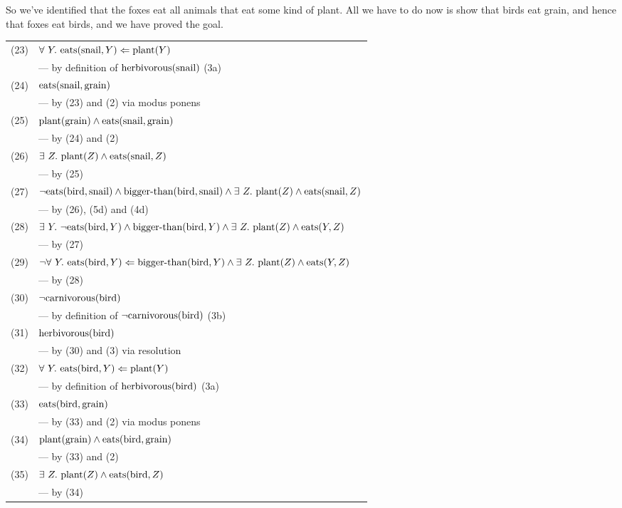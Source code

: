 So we've identified that the foxes eat all animals that eat some kind of
plant.  All we have to do now is show that birds eat grain, and hence
that foxes eat birds, and we have proved the goal.

\begin{tabular}{rl}
(23) & $\forall\ Y.\ \text{eats}(\text{snail}, Y) \Leftarrow \text{plant}(Y)$
\\ & --- by definition of $\text{herbivorous}(\text{snail})$ (3a) \\
(24) & $\text{eats}(\text{snail}, \text{grain})$
\\ & --- by (23) and (2) via modus ponens \\
(25) & $\text{plant}(\text{grain}) \wedge \text{eats}(\text{snail}, \text{grain})$
\\ & --- by (24) and (2) \\
(26) & $\exists\ Z.\ \text{plant}(Z) \wedge \text{eats}(\text{snail}, Z)$
\\ & --- by (25) \\
(27) & $\neg{}\text{eats}(\text{bird}, \text{snail}) \wedge
        \text{bigger-than}(\text{bird}, \text{snail}) \wedge
        \exists\ Z.\ \text{plant}(Z) \wedge \text{eats}(\text{snail}, Z)$
\\ & --- by (26), (5d) and (4d) \\
(28) & $\exists\ Y.\ 
            \neg{}\text{eats}(\text{bird}, Y) \wedge
            \text{bigger-than}(\text{bird}, Y) \wedge
            \exists\ Z.\ \text{plant}(Z) \wedge \text{eats}(Y, Z)$
\\ & --- by (27) \\
(29) & $\neg{}\forall\ Y.\ 
            \text{eats}(\text{bird}, Y) \Leftarrow
            \text{bigger-than}(\text{bird}, Y) \wedge
            \exists\ Z.\ \text{plant}(Z) \wedge \text{eats}(Y, Z)$
\\ & --- by (28) \\
(30) & $\neg{}\text{carnivorous}(\text{bird})$
\\ & --- by definition of $\neg{}\text{carnivorous}(\text{bird})$ (3b) \\
(31) & $\text{herbivorous}(\text{bird})$
\\ & --- by (30) and (3) via resolution \\
(32) & $\forall\ Y.\ \text{eats}(\text{bird}, Y) \Leftarrow \text{plant}(Y)$
\\ & --- by definition of $\text{herbivorous}(\text{bird})$ (3a) \\
(33) & $\text{eats}(\text{bird}, \text{grain})$
\\ & --- by (33) and (2) via modus ponens \\
(34) & $\text{plant}(\text{grain}) \wedge \text{eats}(\text{bird}, \text{grain})$
\\ & --- by (33) and (2) \\
(35) & $\exists\ Z.\ \text{plant}(Z) \wedge \text{eats}(\text{bird}, Z)$
\\ & --- by (34) \\

\end{tabular}
